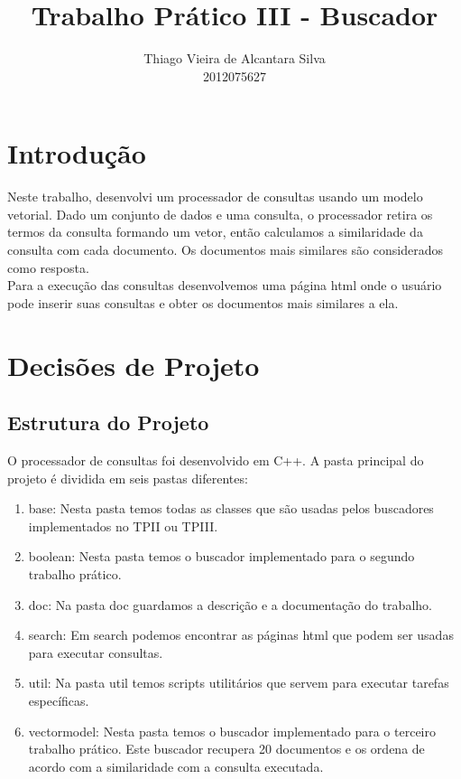 \documentclass[11pt]{article}
\title{\textbf{Trabalho Prático III - Buscador}}
\author{Thiago Vieira de Alcantara Silva\\2012075627}
\date{}
\begin{document}
\maketitle

\section{Introdução}
Neste trabalho, desenvolvi um processador de consultas usando um modelo vetorial. Dado um conjunto de dados e uma consulta, o processador retira os termos da consulta formando um vetor, então calculamos a similaridade da consulta com cada documento. Os documentos mais similares são considerados como resposta.\\
Para a execução das consultas desenvolvemos uma página html onde o usuário pode inserir suas consultas e obter os documentos mais similares a ela.


\section{Decisões de Projeto}
\subsection{Estrutura do Projeto}
O processador de consultas foi desenvolvido em C++.
A pasta principal do projeto é dividida em seis pastas diferentes:
\begin{enumerate}
\item base: Nesta pasta temos todas as classes que são usadas pelos buscadores implementados no TPII ou TPIII.
\item boolean: Nesta pasta temos o buscador implementado para o segundo trabalho prático.
\item doc: Na pasta doc guardamos a descrição e a documentação do trabalho.
\item search: Em search podemos encontrar as páginas html que podem ser usadas para executar consultas.
\item util: Na pasta util temos scripts utilitários que servem para executar tarefas específicas.
\item vectormodel: Nesta pasta temos o buscador implementado para o terceiro trabalho prático. Este buscador recupera 20 documentos e os ordena de acordo com a similaridade com a consulta executada.
\end{enumerate}
\end{document}
